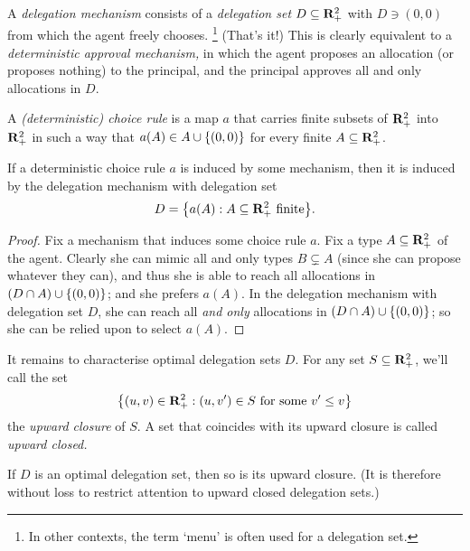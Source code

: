 A \emph{delegation mechanism} consists of a \emph{delegation set} $D \subseteq \mathbf{R}_+^2$ with $D \ni (0,0)$
from which the agent freely chooses.%
	\footnote{In other contexts, the term `menu' is often used for a delegation set.}
(That's it!)
This is clearly equivalent to a \emph{deterministic approval mechanism,} in which the agent proposes an allocation (or proposes nothing) to the principal, and the principal approves all and only allocations in $D$.

A \emph{(deterministic) choice rule} is a map $a$
that carries finite subsets of $\mathbf{R}_+^2$ into $\mathbf{R}_+^2$
in such a way that $a(A) \in A \cup \{(0,0)\}$ for every finite $A \subseteq \mathbf{R}_+^2$.

\begin{namedthm}
	\label{namedthm:taxation}
	If a deterministic choice rule $a$ is induced by some mechanism,
	then it is induced by the delegation mechanism with delegation set
	\begin{equation*}
		D = \left\{ a(A) : \text{$A \subseteq \R_+^2$ finite} \right\} .
	\end{equation*}
\end{namedthm}

\begin{proof}
	Fix a mechanism that induces some choice rule $a$.
	Fix a type $A \subseteq \mathbf{R}_+^2$ of the agent.
	Clearly she can mimic all and only types $B \subsetneq A$
	(since she can propose whatever they can),
	and thus she is able to reach all allocations in
	$(D \cap A) \cup \{(0,0)\}$;
	and she prefers $a(A)$.
	In the delegation mechanism with delegation set $D$,
	she can reach all \emph{and only} allocations in $(D \cap A) \cup \{(0,0)\}$;
	so she can be relied upon to select $a(A)$.
\end{proof}


It remains to characterise optimal delegation sets $D$.
For any set $S \subseteq \mathbf{R}_+^2$, we'll call the set
%
\begin{equation*}
	\left\{
	(u,v) \in \R_+^2 : \text{$(u,v') \in S$ for some $v' \leq v$}
	\right\}
\end{equation*}
%
the \emph{upward closure} of $S$.
A set that coincides with its upward closure is called \emph{upward closed.}

\begin{observation}
	\label{observation:av10_downward}
	If $D$ is an optimal delegation set,
	then so is its upward closure.
	(It is therefore without loss to restrict attention to upward closed delegation sets.)
\end{observation}

